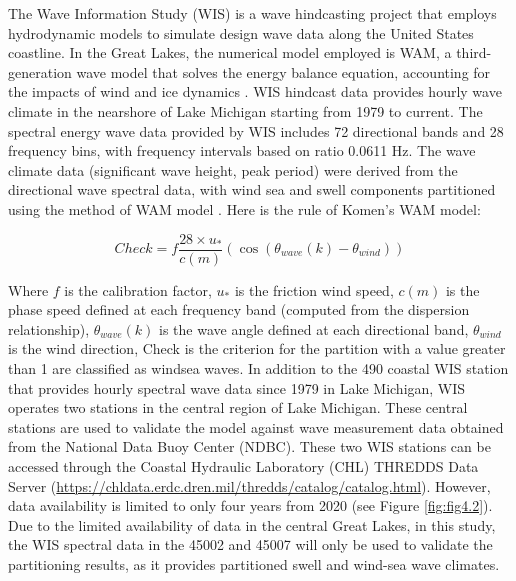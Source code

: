 The Wave Information Study (WIS) is a wave hindcasting project that employs
hydrodynamic models to simulate design wave data along the United States
coastline. In the Great Lakes, the numerical model employed is WAM, a
third-generation wave model that solves the energy balance equation, accounting
for the impacts of wind and ice dynamics \citep{jensen_lake_2012}. WIS hindcast
data provides hourly wave climate in the nearshore of Lake Michigan starting
from 1979 to current. The spectral energy wave data provided by WIS includes 72
directional bands and 28 frequency bins, with frequency intervals based on ratio
0.0611 Hz. The wave climate data (\eg significant wave height, peak period) were
derived from the directional wave spectral data, with wind sea and swell
components partitioned using the method of WAM model
\citep{komen_dynamics_1994}. Here is the rule of Komen's WAM model:

\begin{equation}
    Check = f\frac{28\times u_*}{c(m)}(\cos(\theta_{wave}(k)-\theta_{wind}))
\label{eq:eq4.1}
\end{equation}

Where $f$ is the calibration factor,  $u_*$ is the friction wind speed, $c(m)$
is the phase speed defined at each frequency band (computed from the dispersion
relationship), $\theta_{wave}(k)$ is the wave angle defined at each directional
band, $\theta_{wind}$ is the wind direction, Check  is the criterion for the
partition with a value greater than 1 are classified as windsea waves. In
addition to the 490 coastal WIS station that provides hourly spectral wave data
since 1979 in Lake Michigan, WIS operates two stations in the central region of
Lake Michigan.  These central stations are used to validate the model against
wave measurement data obtained from the National Data Buoy Center (NDBC). These
two WIS stations can be accessed through the Coastal Hydraulic Laboratory (CHL)
THREDDS Data Server
(\url{https://chldata.erdc.dren.mil/thredds/catalog/catalog.html}). However,
data availability is limited to only four years from 2020 (see Figure
\ref{fig:fig4.2}). Due to the limited availability of data in the central Great
Lakes, in this study, the WIS spectral data in the 45002 and 45007 will only be
used to validate the partitioning results, as it provides partitioned swell and
wind-sea wave climates.

